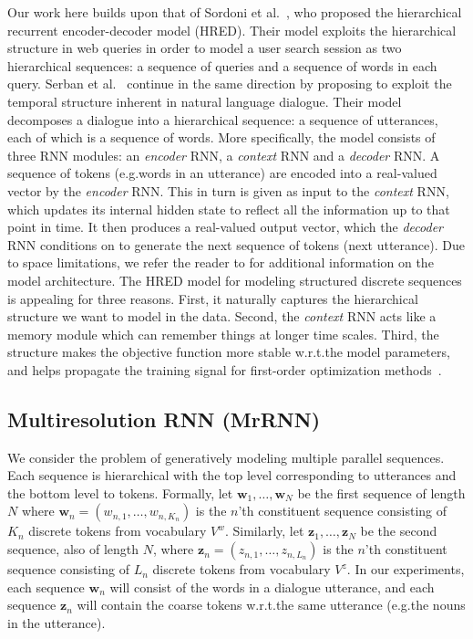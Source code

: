 \documentclass{article}
\begin{document}
Our work here builds upon that of
Sordoni et al.~\cite{sordoni2015ahier}, who proposed the hierarchical recurrent encoder-decoder model (HRED). 
Their model exploits the hierarchical structure in web queries in order to model a user search session as two hierarchical sequences: a sequence of queries and a sequence of words in each query.
Serban et al.~\cite{DBLP:conf/aaai/SerbanSBCP16} continue in the same direction by proposing to exploit the temporal structure inherent in natural language dialogue. 
Their model decomposes a dialogue into a hierarchical sequence: a sequence of utterances, each of which is a sequence of words.
More specifically, the model consists of three RNN modules: an \textit{encoder} RNN, a \textit{context} RNN and a \textit{decoder} RNN.
A sequence of tokens (e.g.\@ words in an utterance) are encoded into a real-valued vector by the \textit{encoder} RNN.
This in turn is given as input to the \textit{context} RNN, which updates its internal hidden state to reflect all the information up to that point in time.
It then produces a real-valued output vector, which the \textit{decoder} RNN conditions on to generate the next sequence of tokens (next utterance).
Due to space limitations, we refer the reader to \cite{sordoni2015ahier,DBLP:conf/aaai/SerbanSBCP16} for additional information on the model architecture.
The HRED model for modeling structured discrete sequences is appealing for three reasons.
First, it naturally captures the hierarchical structure we want to model in the data. 
Second, the \textit{context} RNN acts like a memory module which can remember things at longer time scales.
Third, the structure makes the objective function more stable w.r.t.\@ the model parameters, and helps propagate the training signal for first-order optimization methods~\cite{sordoni2015ahier}.

\subsection{Multiresolution RNN (MrRNN)}



We consider the problem of generatively modeling multiple parallel sequences.
Each sequence is hierarchical with the top level corresponding to utterances and the bottom level to tokens.
Formally, let $\mathbf{w}_1, \dots, \mathbf{w}_N$ be the first sequence of length $N$ where $\mathbf{w}_n = (w_{n,1}, \dots, w_{n,K_n})$ is the $n$'th constituent sequence consisting of $K_n$ discrete tokens from vocabulary $V^w$.
Similarly, let $\mathbf{z}_1, \dots, \mathbf{z}_N$ be the second sequence, also of length $N$, where $\mathbf{z}_n = (z_{n,1}, \dots, z_{n,L_n})$ is the $n$'th constituent sequence consisting of $L_n$ discrete tokens from vocabulary $V^z$.
In our experiments, each sequence $\mathbf{w}_n$ will consist of the words in a dialogue utterance, and each sequence $\mathbf{z}_n$ will contain the coarse tokens w.r.t.\@ the same utterance (e.g.\@ the nouns in the utterance).
\end{document}
